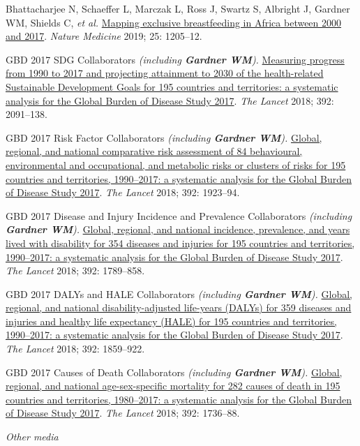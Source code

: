\documentclass[11pt,article,oneside]{memoir}
\begin{document}
\ind Bhattacharjee N, Schaeffer L, Marczak L, Ross J, Swartz S, Albright J, {\minbold Gardner WM}, Shields C, \emph{et al.} 
\href{https://doi.org/10.1038/s41591-019-0525-0}{Mapping exclusive breastfeeding in Africa between 2000 and 2017}. \emph{Nature Medicine} 2019; 25: 1205--12.

\ind GBD 2017 SDG Collaborators \emph{(including \textbf{Gardner WM}).} \href{https://doi.org/10.1016/S0140-6736(18)32281-5}{Measuring progress from 1990 to 2017 and
projecting attainment to 2030 of the health-related Sustainable Development Goals for 195 countries and
territories: a systematic analysis for the Global Burden of Disease Study 2017}. \emph{The Lancet} 2018; 392: 2091--138.

\ind GBD 2017 Risk Factor Collaborators \emph{(including \textbf{Gardner WM}).} \href{https://doi.org/10.1016/S0140-6736(18)32225-6}{Global, regional, and national comparative
risk assessment of 84 behavioural, environmental and occupational, and metabolic risks or clusters of risks
for 195 countries and territories, 1990--2017: a systematic analysis for the Global Burden of Disease Study
2017}. \emph{The Lancet} 2018; 392: 1923--94.

\ind GBD 2017 Disease and Injury Incidence and Prevalence Collaborators \emph{(including \textbf{Gardner WM}).} \href{https://doi.org/10.1016/S0140-6736(18)32279-7}{Global, regional, and national incidence,
prevalence, and years lived with disability for 354 diseases and injuries for 195 countries and territories, 1990--2017: a 
systematic analysis for the Global Burden of Disease Study 2017}. \emph{The Lancet} 2018; 392: 1789--858.

\ind GBD 2017 DALYs and HALE Collaborators \emph{(including \textbf{Gardner WM}).} \href{https://doi.org/10.1016/S0140-6736(18)32335-3}{Global, regional, and national disability-adjusted
life-years (DALYs) for 359 diseases and injuries and healthy life expectancy (HALE) for 195 countries and
territories, 1990--2017: a systematic analysis for the Global Burden of Disease Study 2017}. \emph{The Lancet} 2018; 392: 1859--922.

\ind GBD 2017 Causes of Death Collaborators \emph{(including \textbf{Gardner WM}).} \href{https://doi.org/10.1016/S0140-6736(18)32203-7}{Global, regional, and national age-sex-specific
mortality for 282 causes of death in 195 countries and territories, 1980--2017: a systematic analysis for the
Global Burden of Disease Study 2017}. \emph{The Lancet} 2018; 392: 1736--88.

\bigskip 
\noindent\emph{Other media \vspace{0.05in}}
\end{document}
